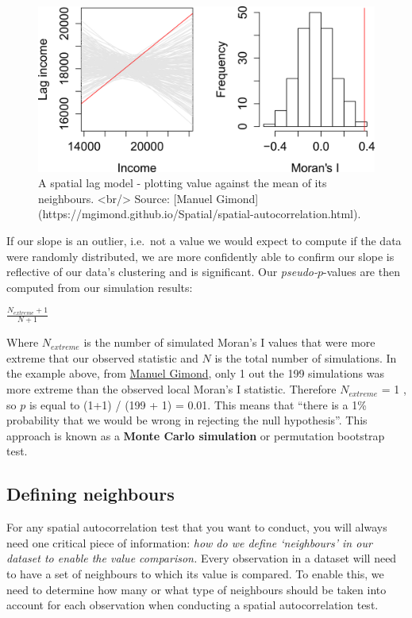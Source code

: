 \documentclass[
]{book}
\begin{document}
\begin{figure}

{\centering \includegraphics[width=30.39in]{images/w07/MC_sim_1} 

}

\caption{A spatial lag model - plotting value against the mean of its neighbours. <br/> Source: [Manuel Gimond](https://mgimond.github.io/Spatial/spatial-autocorrelation.html).}\label{fig:07-spatial-lag-plt}
\end{figure}

If our slope is an outlier, i.e.~not a value we would expect to compute if the data were randomly distributed, we are more confidently able to confirm our slope is reflective of our data's clustering and is significant. Our \emph{pseudo-}\(p\)-values are then computed from our simulation results:

\(\frac{N_{extreme} + 1}{N + 1}\)

Where \({N_{extreme}}\) is the number of simulated Moran's I values that were more extreme that our observed statistic and \({N}\) is the total number of simulations. In the example above, from \href{https://mgimond.github.io/Spatial/spatial-autocorrelation.html}{Manuel Gimond}, only 1 out the 199 simulations was more extreme than the observed local Moran's I statistic. Therefore \({N_{extreme}}\) = 1 , so \(p\) is equal to (1+1) / (199 + 1) = 0.01. This means that ``there is a 1\% probability that we would be wrong in rejecting the null hypothesis''. This approach is known as a \textbf{Monte Carlo simulation} or permutation bootstrap test.

\hypertarget{defining-neighbours}{%
\subsection{Defining neighbours}\label{defining-neighbours}}

For any spatial autocorrelation test that you want to conduct, you will always need one critical piece of information: \emph{how do we define `neighbours' in our dataset to enable the value comparison.} Every observation in a dataset will need to have a set of neighbours to which its value is compared. To enable this, we need to determine how many or what type of neighbours should be taken into account for each observation when conducting a spatial autocorrelation test.
\end{document}
